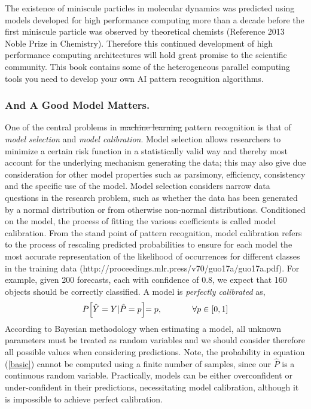 \documentclass[10pt]{article}[draft]
\begin{document}
The existence of miniscule particles in molecular dynamics was predicted using models developed for high performance computing more than a decade before the first miniscule particle was observed  by theoretical chemists (Reference 2013 Noble Prize in Chemistry). Therefore this continued development of high performance computing architectures will hold great promise to the scientific community. This book contains some of the  heterogeneous parallel computing  tools you need to develop your own AI pattern recognition algorithms.
\vspace{0.25in}

\subsubsection{And A Good Model Matters.}

One of the central problems in \st{machine learning} pattern recognition is that of \emph{model selection} and \emph{model calibration}. Model selection allows researchers to minimize a certain risk function in a statistically valid way and thereby most account for the underlying mechanism generating the data; this may also give due consideration for other model properties such as parsimony, efficiency, consistency and  the specific use of the model. Model selection considers narrow data questions in the research  problem, such as whether the data has been generated by a normal distribution or from otherwise non-normal distributions. Conditioned on the model, the process of fitting the various coefficients is called model calibration. From the stand point of pattern recognition, model calibration refers to the process of  rescaling predicted probabilities to ensure for each model the most accurate representation of the likelihood of occurrences for different classes in the training data (http://proceedings.mlr.press/v70/guo17a/guo17a.pdf). For example, given 200 forecasts, each with confidence of 0.8, we expect that 160 objects should be correctly classified.  A model is \emph{perfectly calibrated} as, 
\begin{equation}
	P \Bigr[ \hat{Y} = Y | \hat{P}  = p \Bigl] = p, \hspace{0.5in} \forall p \in [0,1]
	\label{basic}
\end{equation}
According to Bayesian methodology when estimating a model, all unknown parameters must be treated as random variables and we should consider therefore  all possible values when considering predictions. Note,  the probability in equation (\ref{basic}) cannot be computed using a finite number of samples, since our $\hat{P}$ is a continuous random variable. Practically, models can be either overconfident or under-confident in their predictions, necessitating model calibration, although it is impossible to achieve perfect calibration.  
\end{document}
